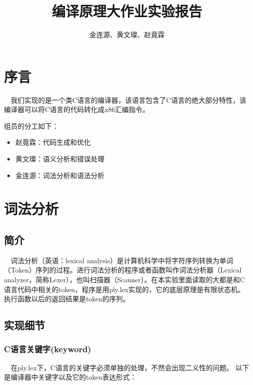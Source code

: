 \documentclass{article}
\title{编译原理大作业实验报告}
\author{金连源、黄文璨、赵竟霖}
\begin{document}
	

\newpage
\tableofcontents
\newpage


\section{序言}

\quad \ \  我们实现的是一个类C语言的编译器，该语言包含了C语言的绝大部分特性，该编译器可以将C语言的代码转化成x86汇编指令。

组员的分工如下：
\begin{itemize}
\item 赵竟霖：代码生成和优化
\item 黄文璨：语义分析和错误处理
\item 金连源：词法分析和语法分析
\end{itemize}

\section{词法分析}

\subsection{简介}

\quad \ \  词法分析（英语：lexical analysis）是计算机科学中将字符序列转换为单词（Token）序列的过程。进行词法分析的程序或者函数叫作词法分析器（Lexical analyzer，简称Lexer），也叫扫描器（Scanner）。在本实验里面读取的大都是和C语言代码中相关的token，程序是用ply.lex实现的，它的底层原理是有限状态机。执行函数以后的返回结果是token的序列。

\subsection{实现细节}

\subsubsection{C语言关键字(keyword)}

\quad \ \  在ply.lex下，C语言的关键字必须单独的处理，不然会出现二义性的问题。
以下是编译器中关键字以及它的token表达形式：
\end{document}
